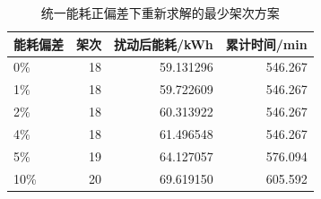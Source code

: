 \begin{table}[htbp]\centering\small
\caption{统一能耗正偏差下重新求解的最少架次方案}\label{tab:q1_sensitivity}
\begin{tabular}{@{}lrrr@{}}
\toprule
能耗偏差 & 架次 & 扰动后能耗/kWh & 累计时间/min\\
\midrule
0\% & 18 & 59.131296 & 546.267\\
1\% & 18 & 59.722609 & 546.267\\
2\% & 18 & 60.313922 & 546.267\\
4\% & 18 & 61.496548 & 546.267\\
5\% & 19 & 64.127057 & 576.094\\
10\% & 20 & 69.619150 & 605.592\\
\bottomrule
\end{tabular}
\end{table}
